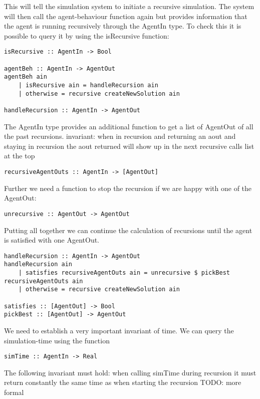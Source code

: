 This will tell the simulation system to initiate a recursive simulation. The system will then call the agent-behaviour function again but provides information that the agent is running recursively through the AgentIn type. To check this it is possible to query it by using the isRecursive function:

\begin{lstlisting}[frame=single]
isRecursive :: AgentIn -> Bool

agentBeh :: AgentIn -> AgentOut
agentBeh ain 
	| isRecursive ain = handleRecursion ain
	| otherwise = recursive createNewSolution ain
	
handleRecursion :: AgentIn -> AgentOut
\end{lstlisting}

The AgentIn type provides an additional function to get a list of AgentOut of all the past recursions.  invariant: when in recursion and returning an aout and staying in recursion the aout returned will show up in the next recursive calls list at the top

\begin{lstlisting}[frame=single]
recursiveAgentOuts :: AgentIn -> [AgentOut]
\end{lstlisting}

Further we need a function to stop the recursion if we are happy with one of the AgentOut:

\begin{lstlisting}[frame=single]
unrecursive :: AgentOut -> AgentOut
\end{lstlisting}

Putting all together we can continue the calculation of recursions until the agent is satisfied with one AgentOut. 

\begin{lstlisting}[frame=single]
handleRecursion :: AgentIn -> AgentOut
handleRecursion ain 
	| satisfies recursiveAgentOuts ain = unrecursive $ pickBest recursiveAgentOuts ain
	| otherwise = recursive createNewSolution ain

satisfies :: [AgentOut] -> Bool
pickBest :: [AgentOut] -> AgentOut
\end{lstlisting}

We need to establish a very important invariant of time. We can query the simulation-time using the function
\begin{lstlisting}[frame=single]
simTime :: AgentIn -> Real
\end{lstlisting}

The following invariant must hold: when calling simTime during recursion it must return constantly the same time as when starting the recursion
TODO: more formal

